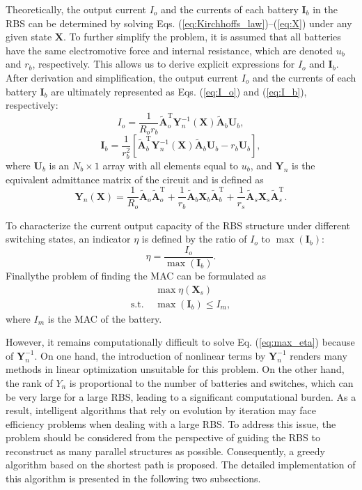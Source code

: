 \documentclass{article}
\def\T{\mathrm{T}}
\providecommand{\DIFadd}[1]{{\protect\color{blue}\uwave{#1}}} %
\providecommand{\DIFaddbegin}{} %
\providecommand{\DIFaddend}{} %
\newcommand{\DIFaddincludegraphics}[2][]{{\color{blue}\fbox{\DIFOincludegraphics[#1]{#2}}}} %
\DeclareRobustCommand{\DIFaddbegin}{\DIFOaddbegin \let\includegraphics\DIFaddincludegraphics} %
\DeclareRobustCommand{\DIFaddend}{\DIFOaddend \let\includegraphics\DIFOincludegraphics} %
\begin{document}
Theoretically, the output current $I_o$ and the currents of each battery $\bm{I}_b$ in the RBS  can be determined by solving Eqs. (\ref{eq:Kirchhoffs_law})--(\ref{eq:X}) under any given state $\bm{X}$.
To further simplify the problem, it is assumed that all batteries have the same electromotive force and internal resistance, which are denoted $u_b$ and $r_b$, respectively.
This allows us to derive explicit expressions for $I_o$ and $\bm{I}_b$.
After derivation and simplification, the output current $I_o$ and the currents of each battery $\bm{I}_b$ are ultimately represented as Eqs. (\ref{eq:I_o}) and (\ref{eq:I_b}), respectively:
\begin{equation}\label{eq:I_o}
    I_o = \frac{1}{R_o r_b} \bm{\tilde{A}}_o^\T \bm{Y}_n^{-1}(\bm{X}) \bm{\tilde{A}}_b \bm{U}_b,
\end{equation}
\begin{equation}\label{eq:I_b}
    \bm{I}_b = \frac{1}{r_b^2}[\bm{\tilde{A}}_b^\T \bm{Y}_n^{-1}(\bm{X}) \bm{\tilde{A}}_b\bm{U}_b -r_b \bm{U}_b],
\end{equation}
where $\bm{U}_b$ is an $N_b\times 1$ array with all elements equal to $u_b$,
and $\bm{Y}_n$ is the equivalent admittance matrix of the circuit and is defined as
\begin{equation}\label{eq:Yn}
    \bm{Y}_n (\bm{X}) = \frac{1}{R_o} \bm{\tilde{A}}_o\bm{\tilde{A}}_o^\T + \frac{1}{r_b} \bm{\tilde{A}}_b\bm{X}_b\bm{\tilde{A}}_b^\T + \frac{1}{r_s}\bm{\tilde{A}}_s\bm{X}_s\bm{\tilde{A}}_s^\T.
\end{equation}


To characterize the current output capacity of the RBS structure under different switching states, an indicator $\eta$ is defined by the ratio of $I_o$ to $\max (\bm{I}_b)$:
\begin{equation}\label{eq:eta}
    \eta = \frac{I_o}{\max (\bm{I}_b)}.
\end{equation}
Finally\DIFaddbegin \DIFadd{, }\DIFaddend the problem of finding the MAC can be formulated as
\begin{align}
    & \max \eta(\bm{X}_s) \label{eq:max_eta}\\
    \text{s.t. } & \max (\bm{I}_b) \leq I_m, \label{eq:Ib_leq_Im}
\end{align}
where $I_m$ is the MAC of the battery.


However, it remains computationally difficult to solve Eq. (\ref{eq:max_eta}) because of $\bm{Y}_n^{-1}$.
On one hand,  the introduction of nonlinear terms by $\bm{Y}_n^{-1}$ renders many  methods in linear optimization unsuitable for this problem.
On the other hand, the rank of $Y_{n}$ is proportional to the number of batteries and switches, which can be very large for a large RBS, leading to a significant computational burden.
As a result, intelligent algorithms that rely on evolution by iteration may face efficiency problems when dealing with a large RBS.
To address this issue, the problem should be considered from the perspective of guiding the RBS to reconstruct as many parallel structures as possible.
Consequently, a greedy algorithm based on the shortest path is proposed. 
The detailed implementation of this algorithm is presented in the following two subsections.
\end{document}
